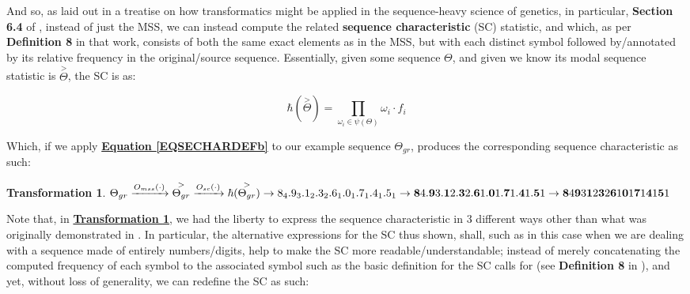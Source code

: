 \documentclass[a4paper, 18pt]{book} %
\newtheorem{trans}{Transformation}
\begin{document}
\begin{appendices}
And so, as laid out in a treatise on how transformatics might be applied in the sequence-heavy science of genetics\cite{lutalo_2025_trans_genetics}, in particular, \textbf{Section 6.4} of \cite{lutalo_2025_trans_genetics}, instead of just the MSS, we can instead compute the related \textbf{sequence characteristic} (SC) statistic, and which, as per \textbf{Definition 8} in that work, consists of both the same exact elements as in the MSS, but with each distinct symbol followed by/annotated by its relative frequency in the original/source sequence. Essentially, given some sequence $\Theta$, and given we know its modal sequence statistic is $\overset{>}{\Theta}$, the SC is as:

\vspace{1em}
\begin{equation}
\label{EQSECHARDEFb}
 \hbar(\overset{>}{\Theta}) = \prod\limits_{\omega_i \in \psi(\Theta)} \omega_i\cdot f_i
\end{equation}
\vspace{1em}

Which, if we apply \textbf{\hyperref[EQSECHARDEFb]{Equation \ref{EQSECHARDEFb}}} to our example sequence $\Theta_{gr}$, produces the corresponding sequence characteristic as such:

\vspace{1em}
\begin{trans}
\label{TRANSSCGRb}
$ \Theta_{gr} \xrightarrow{O_{mss}(\cdot)} \overset{>}{\Theta_{gr}}  \xrightarrow{O_{sc}(\cdot)} \hbar(\overset{>}{\Theta_{gr}}) \rightarrow 8_4.9_3.1_2.3_2.6_1.0_1.7_1.4_1.5_1 \\
 \rightarrow \textbf{8}4.\textbf{9}3.\textbf{1}2.\textbf{3}2.\textbf{6}1.\textbf{0}1.\textbf{7}1.\textbf{4}1.\textbf{5}1 \rightarrow \textbf{8}4\textbf{9}3\textbf{1}2\textbf{3}2\textbf{6}1\textbf{0}1\textbf{7}1\textbf{4}1\textbf{5}1$
\end{trans}
\vspace{1em}

Note that, in \textbf{\hyperref[TRANSSCGRb]{Transformation \ref{TRANSSCGRb}}}, we had the liberty to express the sequence characteristic in 3 different ways other than what was originally demonstrated in \cite{lutalo_2025_trans_genetics}. In particular, the alternative expressions for the SC thus shown, shall, such as in this case when we are dealing with a sequence made of entirely numbers/digits, help to make the SC more readable/understandable; instead of merely concatenating the computed frequency of each symbol to the associated symbol such as the basic definition for the SC calls for (see \textbf{Definition 8} in \cite{lutalo_2025_trans_genetics}), and yet, without loss of generality, we can redefine the SC as such:


\end{appendices}
\end{document}
